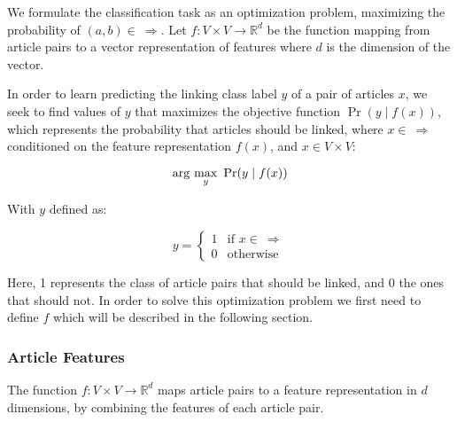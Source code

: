 
We formulate the classification task as an optimization problem, maximizing the probability of $(a,b) \in \ \Rightarrow$. Let $f: V\times V \to \mathbb{R}^d$ be the function mapping from article pairs to a vector representation of features where $d$ is the dimension of the vector.

In order to learn predicting the linking class label $y$ of a pair of articles $x$,
we seek to find values of $y$ that maximizes the objective function $\Pr(y \mid f(x))$, which represents the probability that articles should be linked, where $x \in \ \Rightarrow$ conditioned on the feature representation $f(x)$, and $x \in V \times V$:

\begin{equation}
\label{objective}
\arg\ \!\max_y\ \Pr(y \mid f(x))
\end{equation}

With $y$ defined as:

\[
    y=
\begin{cases}
    1 & \text{if } x \in \  \Rightarrow\\
    0 & \text{otherwise}
\end{cases}
\]

Here, 1 represents the class of article pairs that should be linked, and 0 the ones that should not.
In order to solve this optimization problem we first need to define $f$ which will be described in the following section.

\subsubsection{Article Features}

The function $f: V\times V \to \mathbb{R}^d$ maps article pairs to a feature representation in $d$ dimensions, by combining the features of each article pair.

